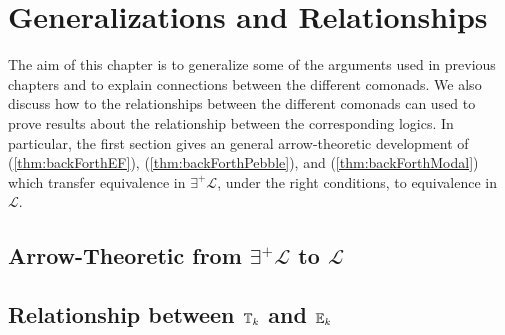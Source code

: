 \chapter{Generalizations and Relationships}
The aim of this chapter is to generalize some of the arguments used in previous chapters and to explain connections between the different comonads. We also discuss how to the relationships between the different comonads can used to prove results about the relationship between the corresponding logics. In particular, the first section gives an general arrow-theoretic development of (\ref{thm:backForthEF}), (\ref{thm:backForthPebble}), and (\ref{thm:backForthModal}) which transfer equivalence in $\exists^{+}\mathcal{L}$, under the right conditions, to equivalence in $\mathcal{L}$. 
\section{Arrow-Theoretic from $\exists^{+}\mathcal{L}$ to $\mathcal{L}$}

\section{Relationship between ${\mathbb{T}_{k}}$ and ${\mathbb{E}_{k}}$}
